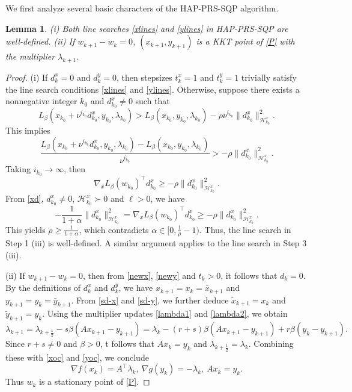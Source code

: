 \documentclass[pdflatex,sn-mathphys-num]{sn-jnl}%
\theoremstyle{thmstyleone}%
\newtheorem{lemma}{Lemma}
\theoremstyle{thmstyletwo}%
\theoremstyle{thmstylethree}%
\begin{document}
We first analyze several basic characters of the HAP-PRS-SQP algorithm.
\begin{lemma}\label{lem1}
	(i) Both line searches \eqref{xlines} and \eqref{ylines} in HAP-PRS-SQP are well-defined.
	(ii) If $w_{k+1}-w_k=0$, $(x_{k+1},y_{k+1})$ is a KKT point of \eqref{P} with the multiplier $\lambda_{k+1}$.
\end{lemma}
\begin{proof}
	(i) If $d_k^x=0$ and $d_k^y=0$, then stepsizes $t_k^x=1$ and $t_k^y=1$ trivially satisfy the line search conditions \eqref{xlines} and \eqref{ylines}. Otherwise, suppose there exists a nonnegative integer $k_0$ and $d_{k_0}^x\ne 0$ such that
	\[
	L_{\beta}(x_{k_0}+\nu^{i_{k_0}}d_{k_0}^{x}, y_{k_0}, \lambda_{k_0}) > L_{\beta}(x_{k_0}, y_{k_0}, \lambda_{k_0})-\rho \nu^{i_{k_0}}\|d_{k_0}^{x}\|_{\mathcal{H}_{k_0}^x}^{2}.
	\]
	This implies
	\[
	\frac{L_{\beta}(x_{k_0}+\nu^{i_{k_0}}d_{k_0}^{x}, y_{k_0}, \lambda_{k_0})-L_{\beta}(x_{k_0}, y_{k_0}, \lambda_{k_0})}{\nu^{i_{k_0}}} >-\rho \|d_{k_0}^{x}\|_{\mathcal{H}_{k_0}^x}^{2}.
	\]
	Taking $i_{k_0}\to \infty$, then
	\[
	\nabla _x L_{\beta}(w_{k_0})^{\top}d_{k_0}^x \geq -\rho \|d_{k_0}^{x}\|_{\mathcal{H}_{k_0}^x}^{2}.
	\]
	From \eqref{xd}, $d_{k_0}^x\ne 0$, $\mathcal{H}_{k_0}^x\succ0$ and $\ell>0$, we have
	\[
	- \frac{1}{1+\alpha}\|d_{k_0}^{x}\|_{\mathcal{H}_{k_0}^x}^{2}
	=\nabla _x L_{\beta}(w_{k_0})^{\top}d_{k_0}^x \geq -\rho \|d_{k_0}^{x}\|_{\mathcal{H}_{k_0}^x}^{2}.
	\]
	This yields $\rho\geq \frac{1}{1+\alpha}$, which contradicts $\alpha\in [0, \frac{1}{\rho}-1)$. Thus, the line search in Step 1 (iii) is well-defined. A similar argument applies to the line search in Step 3 (iii).
	
	(ii) If $w_{k+1}-w_k=0$, then from \eqref{newx}, \eqref{newy} and $t_k>0$, it follows that $d_k=0$. By the definitions of $d_k^x$ and $d_k^y$, we have $x_{k+1}=x_{k}=\bar{x}_{k+1}$ and $y_{k+1}=y_{k}=\bar{y}_{k+1}$.
	From \eqref{sd-x} and \eqref{sd-y}, we further deduce $\tilde{x}_{k+1}=x_k$ and $\tilde{y}_{k+1}=y_k$.
	Using the multiplier updates \eqref{lambda1} and \eqref{lambda2}, we obtain
	\[
	\lambda_{k+1} = \lambda_{k+\frac{1}{2}}-s \beta(A x_{k+1}-y_{k+1})=\lambda_{k}-(r+s) \beta(A x_{k+1}-y_{k+1})+r\beta(y_{k}-y_{k+1}).
	\]
	Since $r+s\not=0$ and $\beta>0$, t follows that $Ax_k=y_k$ and $\lambda_{k+\frac{1}{2}}=\lambda_{k}$. Combining these with \eqref{xoc} and \eqref{yoc}, we conclude
	\[
	\nabla f(x_k)=A^{\top}\lambda_k,~\nabla g(y_k)=-\lambda_k,~Ax_k=y_k.
	\]
	Thus $w_k$ is a stationary point of \eqref{P}.
\end{proof}
\end{document}
